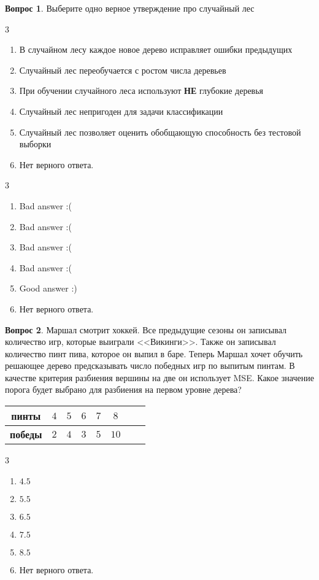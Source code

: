 \documentclass[12pt]{article}
\newenvironment{answerlist}[1][3]{
\begin{multicols}{#1}

\begin{enumerate}[label=\fbox{\emph{\Alph*}},ref=\emph{\alph*}]
}
{
\item Нет верного ответа.
\end{enumerate}
\end{multicols}
}
\theoremstyle{definition}
\newtheorem{question}{Вопрос}
\begin{document}
\begin{question}
Выберите одно верное утверждение про случайный лес
\begin{answerlist}
  \item В случайном лесу каждое новое дерево исправляет ошибки предыдущих
  \item Случайный лес переобучается с ростом числа деревьев
  \item При обучении случайного леса используют \textbf{НЕ} глубокие деревья
  \item Случайный лес непригоден для задачи классификации
  \item Случайный лес позволяет оценить обобщающую способность без тестовой выборки
\end{answerlist}
\end{question}

\begin{solution}
\begin{answerlist}
  \item Bad answer :( 
  \item Bad answer :( 
  \item Bad answer :(
  \item Bad answer :( 
  \item Good answer :)
\end{answerlist}
\end{solution}

\newpage 

\begin{question}
Маршал смотрит хоккей. Все предыдущие сезоны он записывал количество игр, которые выиграли <<Викинги>>. Также он записывал количество пинт пива, которое он выпил в баре. Теперь Маршал хочет обучить решающее дерево предсказывать число победных игр по выпитым пинтам. В качестве критерия разбиения вершины на две он использует MSE. Какое значение порога будет выбрано для разбиения на первом уровне дерева? 

\begin{table}[h]
    \centering
    \begin{tabular}{>{\bfseries}cccccccc}
        \toprule
         пинты & $4$ & $5$ & $6$ & $7$ & $8$  \\ \midrule
         победы & $2$ & $4$ & $3$ & $5$ & $10$ \\
         \bottomrule
    \end{tabular}
\end{table}

\begin{answerlist}
  \item  $4.5$
  \item  $5.5$
  \item  $6.5$
  \item  $7.5$
  \item  $8.5$
\end{answerlist}
\end{question}
\end{document}
